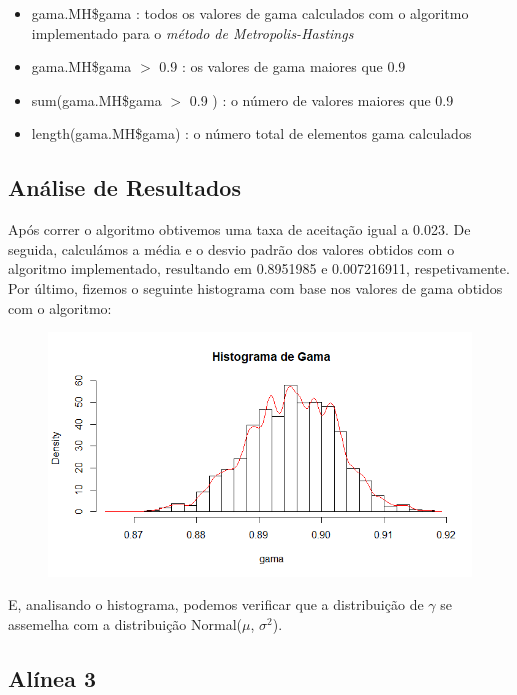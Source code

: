 \documentclass{article}
\begin{document}
				\begin{itemize}
					\item gama.MH\$gama : todos os valores de gama calculados com o algoritmo implementado para o  \textit{método de Metropolis-Hastings}
					\item gama.MH\$gama $>$ 0.9 : os valores de gama maiores que 0.9
					\item sum(gama.MH\$gama $>$ 0.9 ) : o número de valores maiores que 0.9
					\item length(gama.MH\$gama) : o número total de elementos gama calculados
				\end{itemize} 
		
		\subsection*{Análise de Resultados}

		Após correr o algoritmo obtivemos uma taxa de aceitação igual a  0.023. De seguida, calculámos a média e o desvio padrão dos valores obtidos com o algoritmo implementado, resultando em 0.8951985 e 0.007216911, respetivamente. Por último, fizemos o seguinte histograma com base nos valores de gama obtidos com o algoritmo:
				\begin{figure}[!h]
   					 \includegraphics[width=\textwidth]{Histograma}
 				\end{figure}
				

E, analisando o histograma, podemos verificar que a distribuição de $\gamma$ se assemelha com a distribuição Normal($\mu$, $\sigma^2$).

		\subsection*{Alínea 3}
\end{document}
